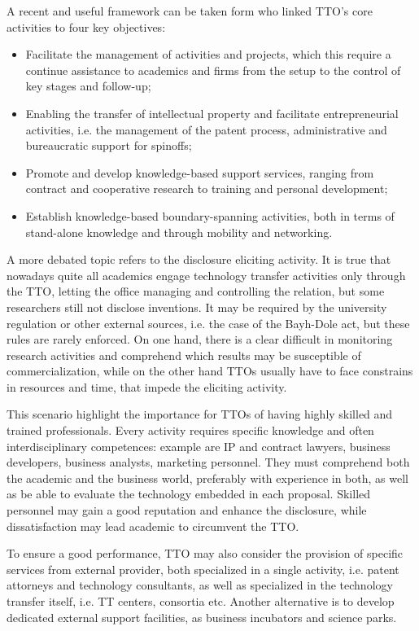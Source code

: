 A recent and useful framework can be taken form \citet{Alexander2013} who linked TTO's core activities to four key objectives: 
\begin{itemize}
\item Facilitate the management of activities and projects, which this require a continue assistance to academics and firms from the setup to the control of key stages and follow-up;
\item Enabling the transfer of intellectual property and facilitate entrepreneurial activities, i.e. the management of the patent process, administrative and bureaucratic support for spinoffs;
\item Promote and develop knowledge-based support services, ranging from contract and cooperative research to training and personal development;
\item Establish knowledge-based boundary-spanning activities, both in terms of stand-alone knowledge and through mobility and networking. 
\end{itemize}

A more debated topic refers to the disclosure eliciting activity. It is true that nowadays quite all academics engage technology transfer activities only through the TTO, letting the office managing and controlling the relation, but some researchers still not disclose inventions. It may be required by the university regulation or other external sources, i.e. the case of the Bayh-Dole act, but these rules are rarely enforced. On one hand, there is a clear difficult in monitoring research activities and comprehend which results may be susceptible of commercialization, while on the other hand TTOs usually have to face constrains in resources and time, that impede the eliciting activity. 

This scenario highlight the importance for TTOs of having highly skilled and trained professionals. Every activity requires specific knowledge and often interdisciplinary competences: example are IP and contract lawyers, business developers, business analysts, marketing personnel. They must comprehend both the academic and the business world, preferably with experience in both, as well as be able to evaluate the technology embedded in each proposal. Skilled personnel may gain a good reputation and enhance the disclosure, while dissatisfaction may lead academic to circumvent the TTO. 

To ensure a good performance, TTO may also consider the provision of specific services from external provider, both specialized in a single activity, i.e. patent attorneys and technology consultants, as well as specialized in the technology transfer itself, i.e. TT centers, consortia etc. Another alternative is to develop dedicated external support facilities, as business incubators and science parks.

